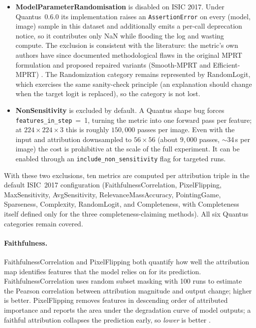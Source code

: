 \begin{itemize}
    \item[$\dagger$] \textbf{ModelParameterRandomisation} is disabled on ISIC
    2017. Under Quantus~0.6.0 its implementation raises an
    \texttt{AssertionError} on every (model, image) sample in this dataset and
    additionally emits a per-call deprecation notice, so it contributes only
    NaN while flooding the log and wasting compute. The exclusion is
    consistent with the literature: the metric's own authors have since
    documented methodological flaws in the original MPRT formulation and
    proposed repaired variants (Smooth-MPRT and Efficient-MPRT)
    \citep{hedstrom2024sanity}. The Randomization category
    remains represented by RandomLogit, which exercises the same sanity-check
    principle (an explanation should change when the target logit is replaced),
    so the category is not lost.
    \item[$\ddagger$] \textbf{NonSensitivity} is excluded by default. A Quantus
    shape bug forces \texttt{features\_in\_step}~=~1, turning the metric into one
    forward pass per feature; at $224 \times 224 \times 3$ this is roughly
    $150{,}000$ passes per image. Even with the input and attribution
    downsampled to $56 \times 56$ (about $9{,}000$ passes, $\sim$34\,s per
    image) the cost is prohibitive at the scale of the full experiment. It can
    be enabled through an \texttt{include\_non\_sensitivity} flag for targeted
    runs.
\end{itemize}

\noindent
With these two exclusions, ten metrics are computed per attribution triple
in the default ISIC~2017 configuration (FaithfulnessCorrelation, PixelFlipping,
MaxSensitivity, AvgSensitivity, RelevanceMassAccuracy, PointingGame,
Sparseness, Complexity, RandomLogit, and Completeness, with Completeness
itself defined only for the three completeness-claiming methods). All six
Quantus categories remain covered.

\paragraph{Faithfulness.}
FaithfulnessCorrelation and PixelFlipping both quantify how well the
attribution map identifies features that the model relies on for its
prediction. FaithfulnessCorrelation uses random subset masking with 100
runs to estimate the Pearson correlation between attribution magnitude and
output change; higher is better. PixelFlipping removes features in
descending order of attributed importance and reports the area under the
degradation curve of model outputs; a faithful attribution collapses the
prediction early, so \emph{lower} is better
\cite{hedstrom2023quantus}.

